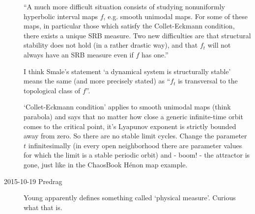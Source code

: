 \begin{description}
``A much more difficult situation consists of studying nonuniformly
hyperbolic interval maps $f$, e.g. smooth unimodal maps. For some of
these maps, in particular those which satisfy the Collet-Eckmann
condition, there exists a unique SRB measure.  Two new difficulties are
that structural stability does not hold (in a rather drastic way), and
that $f_t$ will not always have an SRB measure even if $f$
has one.''

I think Smale's statement `a dynamical system is structurally stable'
means the same (and more precisely stated) as ``$f_{t}$ is transversal to
the topological class of $f$''.

`Collet-Eckmann condition' applies to smooth unimodal maps (think
parabola) and says that no matter how close a generic infinite-time orbit
comes to the critical point, it's Lyapunov exponent is strictly bounded
away from zero. So there are no stable limit cycles. Change the parameter
$t$ infinitesimally (in every open neighborhood there are parameter
values for which the limit is a stable periodic orbit) and - boom! - the
attractor is gone, just like in the ChaosBook H{\'e}non map example.

\item[2015-10-19 Predrag]
Young apparently defines something called `physical measure'.
Curious what that is.


\end{description}
